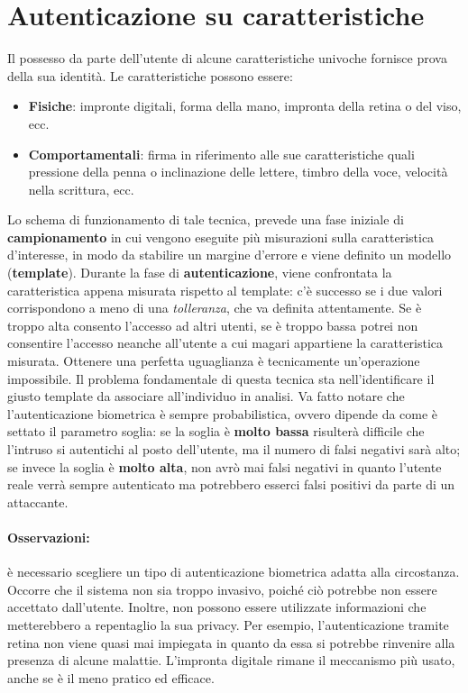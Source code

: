 \section{Autenticazione su caratteristiche}

Il possesso da parte dell’utente di alcune caratteristiche univoche fornisce
prova della sua identità.
Le caratteristiche possono essere:

\begin{itemize}
      \item \textbf{Fisiche}: impronte digitali, forma della mano, impronta
            della retina o del viso, ecc.
      \item \textbf{Comportamentali}:
            firma in riferimento alle sue caratteristiche quali pressione
            della penna o inclinazione delle lettere, timbro della voce,
            velocità nella scrittura, ecc.
\end{itemize}

Lo schema di funzionamento di tale tecnica, prevede una fase iniziale di
\textbf{campionamento} in cui vengono eseguite più misurazioni sulla
caratteristica d’interesse, in modo da stabilire un margine d’errore e viene
definito un modello (\textbf{template}).
Durante la fase di \textbf{autenticazione}, viene confrontata la caratteristica
appena misurata rispetto al template: c’è successo se i due valori corrispondono
a meno di una \textit{tolleranza}, che va definita attentamente.
Se è troppo alta consento l'accesso ad altri utenti, se è troppo bassa potrei
non consentire l'accesso neanche all'utente a cui magari appartiene la
caratteristica misurata.
Ottenere una perfetta uguaglianza è tecnicamente un’operazione impossibile.
Il problema fondamentale di questa tecnica sta nell’identificare il giusto
template da associare all’individuo in analisi.
Va fatto notare che l’autenticazione biometrica è sempre probabilistica,
ovvero dipende da come è settato il parametro soglia: se la soglia
è \textbf{molto bassa} risulterà difficile che l’intruso si autentichi al posto
dell’utente,
ma il numero di falsi negativi sarà alto; se invece la soglia
è \textbf{molto alta}, non avrò mai falsi negativi in quanto l'utente reale
verrà sempre autenticato ma potrebbero esserci falsi positivi da parte di un
attaccante.

\paragraph{Osservazioni:}
è necessario scegliere un tipo di autenticazione
biometrica adatta alla circostanza. Occorre che il sistema non sia troppo
invasivo, poiché ciò potrebbe non essere accettato dall'utente.
Inoltre, non possono essere utilizzate informazioni che metterebbero a
repentaglio la sua privacy. Per esempio, l’autenticazione tramite retina non
viene quasi mai impiegata in quanto da essa si potrebbe rinvenire alla presenza
di alcune malattie. L'impronta digitale rimane il meccanismo più usato,
anche se è il meno pratico ed efficace.

